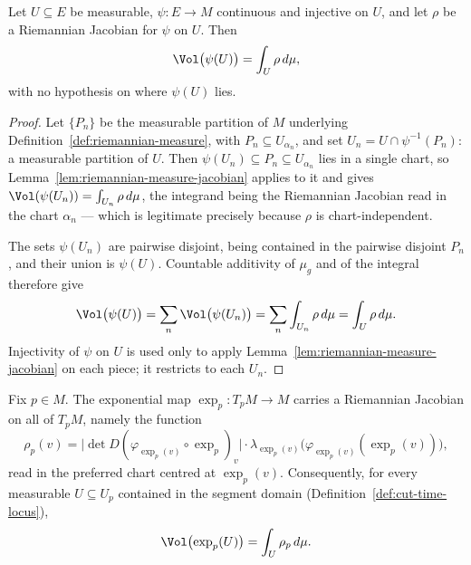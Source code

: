 \begin{lemma}
\label{lem:riemannian-measure-jacobian-global}
\leanok



Let $U\subseteq E$ be measurable, $\psi\colon E\to M$ continuous and
injective on $U$, and let $\rho$ be a Riemannian Jacobian for $\psi$ on
$U$. Then
$$\Vol\bigl(\psi(U)\bigr)=\int_U \rho\,d\mu,$$
with no hypothesis on where $\psi(U)$ lies.
\end{lemma}

\begin{proof}
\sketch
{}
\leanok
Let $\{P_n\}$ be the measurable partition of $M$ underlying
Definition~\ref{def:riemannian-measure}, with $P_n\subseteq
U_{\alpha_n}$, and set $U_n=U\cap\psi^{-1}(P_n)$: a measurable
partition of $U$. Then $\psi(U_n)\subseteq P_n\subseteq U_{\alpha_n}$
lies in a single chart, so
Lemma~\ref{lem:riemannian-measure-jacobian} applies to it and gives
$\Vol(\psi(U_n))=\int_{U_n}\rho\,d\mu$, the integrand being the
Riemannian Jacobian read in the chart $\alpha_n$ --- which is
legitimate precisely because $\rho$ is chart-independent.

The sets $\psi(U_n)$ are pairwise disjoint, being contained in the
pairwise disjoint $P_n$, and their union is $\psi(U)$. Countable
additivity of $\mu_g$ and of the integral therefore give
$$\Vol\bigl(\psi(U)\bigr)=\sum_n\Vol\bigl(\psi(U_n)\bigr)
=\sum_n\int_{U_n}\rho\,d\mu=\int_U\rho\,d\mu.$$
Injectivity of $\psi$ on $U$ is used only to apply
Lemma~\ref{lem:riemannian-measure-jacobian} on each piece; it restricts
to each $U_n$.
\end{proof}

\begin{lemma}
\label{lem:exponential-riemannian-jacobian}



Fix $p\in M$. The exponential map $\exp_p\colon T_pM\to M$ carries a Riemannian
Jacobian on all of $T_pM$, namely the function
$$\rho_p(v)=\bigl\lvert\det D(\varphi_{\exp_p(v)}\circ\exp_p)_v\bigr\rvert\cdot
  \lambda_{\exp_p(v)}\bigl(\varphi_{\exp_p(v)}(\exp_p(v))\bigr),$$
read in the preferred chart centred at $\exp_p(v)$. Consequently, for every measurable
$U\subseteq U_p$ contained in the segment domain (Definition~\ref{def:cut-time-locus}),
$$\Vol\bigl(\exp_p(U)\bigr)=\int_U\rho_p\,d\mu.$$
\end{lemma}

